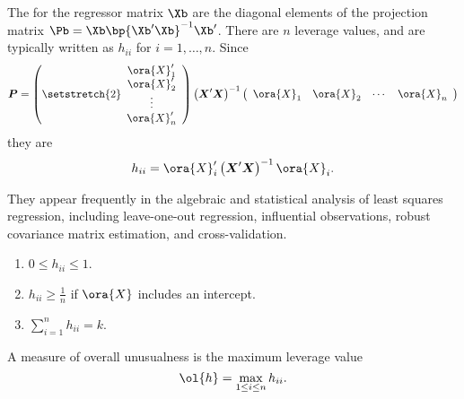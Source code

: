 
The  for the regressor matrix $\Xb$ are the diagonal elements of the projection matrix $\Pb = \Xb \bp{\Xb^\prime \Xb}^{-1} \Xb^\prime$. There are $n$ leverage values, and are typically written as $h_{ii}$ for $i=1, \ldots, n$. Since
\begin{equation}
    \notag
    \boldsymbol{P}=\left({\setstretch{2}\begin{array}{c}
        \ora{X}_1^{\prime} \\
        \ora{X}_2^{\prime} \\
        \vdots \\
        \ora{X}_n^{\prime}
        \end{array}}\right)\left(\boldsymbol{X}^{\prime} \boldsymbol{X}\right)^{-1}\left(\begin{array}{llll}
        \ora{X}_1 & \ora{X}_2 & \cdots & \ora{X}_n
    \end{array}\right)
\end{equation}
they are 
\begin{equation}
    \label{hansen_eq_3_40}
    h_{ii} = \ora{X}_i^{\prime} \left(\boldsymbol{X}^{\prime} \boldsymbol{X}\right)^{-1} \ora{X}_i .
\end{equation}

 They appear frequently in the algebraic and statistical analysis of least squares regression, including leave-one-out regression, influential observations, robust covariance matrix estimation, and cross-validation.

\begin{theorem} 
    \label{hansen_thm_3_6}
    \begin{enumerate}[topsep=10pt, leftmargin=20pt, itemsep=0pt, label=(\arabic*)]
        \setlength{\parskip}{10pt} 
        \item $0 \leq h_{ii} \leq 1$.
        \item $h_{ii} \geq \frac{1}{n}$ if $\ora{X}$ includes an intercept.
        \item $\sum_{i=1}^n h_{ii} = k$.
    \end{enumerate}
\end{theorem}

 A measure of overall unusualness is the maximum leverage value
\begin{equation}
    \label{hansen_eq_3_41}
    \ol{h} = \max_{1 \leq i \leq n} h_{ii}.
\end{equation}

